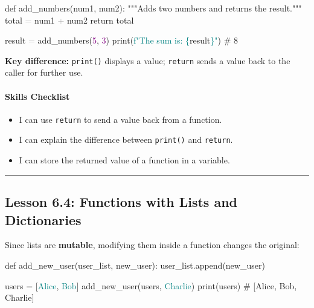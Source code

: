 \documentclass[
  justified,
  openright,
]{tufte-book}
\let\subsubsection\paragraph
\let\paragraph\paragraph
\newcommand{\BuiltInTok}[1]{#1}
\newcommand{\CommentTok}[1]{\textcolor{MidGray}{#1}}
\newcommand{\ControlFlowTok}[1]{\textcolor{BrandBlue}{#1}}
\newcommand{\DecValTok}[1]{\textcolor{Purple}{#1}}
\newcommand{\KeywordTok}[1]{\textcolor{BrandBlue}{#1}}
\newcommand{\NormalTok}[1]{#1}
\newcommand{\OperatorTok}[1]{\textcolor{DarkGray}{#1}}
\newcommand{\SpecialCharTok}[1]{\textcolor{Teal}{#1}}
\newcommand{\SpecialStringTok}[1]{\textcolor{Teal}{#1}}
\newcommand{\StringTok}[1]{\textcolor{Teal}{#1}}
\newenvironment{Shaded}{%
  \begin{snugshade}
}{%
  \end{snugshade}
}
\let\subsubsection\paragraph
\let\paragraph\paragraph
\providecommand{\tightlist}{%
  \setlength{\itemsep}{0pt}\setlength{\parskip}{0pt}}
\begin{document}
\begin{Shaded}
\begin{Highlighting}[]
\KeywordTok{def}\NormalTok{ add\_numbers(num1, num2):}
    \CommentTok{"""Adds two numbers and returns the result."""}
\NormalTok{    total }\OperatorTok{=}\NormalTok{ num1 }\OperatorTok{+}\NormalTok{ num2}
    \ControlFlowTok{return}\NormalTok{ total}

\NormalTok{result }\OperatorTok{=}\NormalTok{ add\_numbers(}\DecValTok{5}\NormalTok{, }\DecValTok{3}\NormalTok{)}
\BuiltInTok{print}\NormalTok{(}\SpecialStringTok{f"The sum is: }\SpecialCharTok{\{}\NormalTok{result}\SpecialCharTok{\}}\SpecialStringTok{"}\NormalTok{)   }\CommentTok{\# 8}
\end{Highlighting}
\end{Shaded}

\textbf{Key difference:} \texttt{print()} displays a value;
\texttt{return} sends a value back to the caller for further use.

\subsubsection{Skills Checklist}\label{skills-checklist-29}

\begin{itemize}
\tightlist
\item[$\square$]
  I can use \texttt{return} to send a value back from a function.
\item[$\square$]
  I can explain the difference between \texttt{print()} and
  \texttt{return}.
\item[$\square$]
  I can store the returned value of a function in a variable.
\end{itemize}

\begin{center}\rule{0.5\linewidth}{0.5pt}\end{center}

\subsection{Lesson 6.4: Functions with Lists and
Dictionaries}\label{lesson-6.4-functions-with-lists-and-dictionaries}

Since lists are \textbf{mutable}, modifying them inside a function
changes the original:

\begin{Shaded}
\begin{Highlighting}[]
\KeywordTok{def}\NormalTok{ add\_new\_user(user\_list, new\_user):}
\NormalTok{    user\_list.append(new\_user)}

\NormalTok{users }\OperatorTok{=}\NormalTok{ [}\StringTok{\textquotesingle{}Alice\textquotesingle{}}\NormalTok{, }\StringTok{\textquotesingle{}Bob\textquotesingle{}}\NormalTok{]}
\NormalTok{add\_new\_user(users, }\StringTok{\textquotesingle{}Charlie\textquotesingle{}}\NormalTok{)}
\BuiltInTok{print}\NormalTok{(users)   }\CommentTok{\# [\textquotesingle{}Alice\textquotesingle{}, \textquotesingle{}Bob\textquotesingle{}, \textquotesingle{}Charlie\textquotesingle{}]}
\end{Highlighting}
\end{Shaded}
\end{document}
